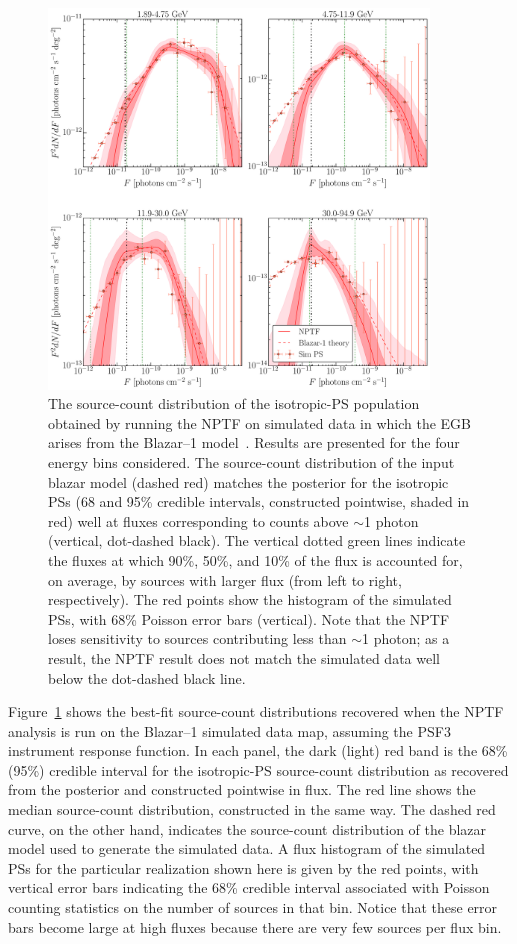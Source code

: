 \begin{figure}[!htbp] 
   \centering
   \includegraphics[width=0.9\textwidth]{ch-igrb/plots/bl1-dnds.pdf} 
   \caption{The source-count distribution of the isotropic-PS population obtained by running the NPTF on simulated data in which the EGB arises from the Blazar--1 model~\cite{Ajello:2015mfa}.  Results are presented for the four energy bins considered.  The source-count distribution of the input blazar model (dashed red) matches the posterior for the isotropic PSs (68 and 95\% credible intervals, constructed pointwise, shaded in red) well at fluxes corresponding to counts above $\sim$1 photon (vertical, dot-dashed black).  The vertical dotted green lines indicate the fluxes at which 90\%, 50\%, and 10\% of the flux is accounted for, on average, by sources with larger flux (from left to right, respectively).  The red points show the histogram of the simulated PSs, with 68\% Poisson error bars (vertical).  Note that the NPTF loses sensitivity to sources contributing less than $\sim$1 photon; as a result, the NPTF result does not match the simulated data well below the dot-dashed black line.  }
   \label{fig:bl1dnds}
\end{figure}

Figure~\ref{fig:bl1dnds} shows the best-fit source-count distributions recovered when the NPTF analysis is run on the Blazar--1 simulated data map, assuming the PSF3 instrument response function.  In each panel, the dark (light) red band is the 68\% (95\%) credible interval for the isotropic-PS source-count distribution as recovered from the posterior and  constructed pointwise in flux. The red line shows the median source-count distribution, constructed in the same way. The dashed red curve, on the other hand, indicates the source-count distribution of the blazar model used to generate the simulated data.  A flux histogram of the simulated PSs for the particular realization shown here is given by the red points, with vertical error bars indicating the 68\% credible interval associated with Poisson counting statistics on the number of sources in that bin.  Notice that these error bars become large at high fluxes because there are very few sources per flux bin. 

